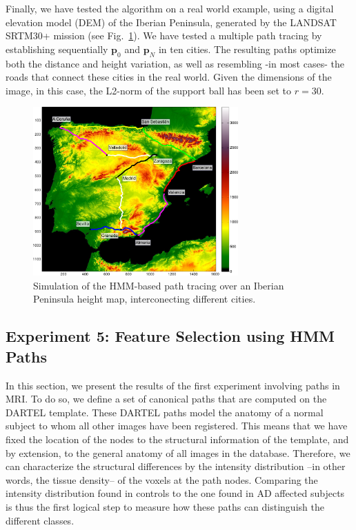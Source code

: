Finally, we have tested the algorithm on a real world example, using a digital elevation model (DEM) of the Iberian Peninsula, generated by the LANDSAT SRTM30+ mission (see Fig.~\ref{fig:spainmap}). We have tested a multiple path tracing by establishing sequentially $\mathbf{p}_0$ and $\mathbf{p}_N$ in ten cities. The resulting paths optimize both the distance and height variation, as well as resembling -in most cases- the roads that connect these cities in the real world. Given the dimensions of the image, in this case, the L2-norm of the support ball has been set to $r=30$. 

\begin{figure}[htp]
	\centering
	\includegraphics[width=0.7\textwidth]{Graphics/ch6/spain.pdf}
	\caption{Simulation of the \ac{HMM}-based path tracing over an Iberian Peninsula height map, interconecting different cities.}
	\label{fig:spainmap}
\end{figure}


\subsection{Experiment 5: Feature Selection using HMM Paths}

In this section, we present the results of the first experiment involving paths in MRI. To do so, we define a set of canonical paths that are computed on the DARTEL template. These DARTEL paths model the anatomy of a normal subject to whom all other images have been registered. This means that we have fixed the location of the nodes to the structural information of the template, and by extension, to the general anatomy of all images in the database. Therefore, we can characterize the structural differences by the intensity distribution --in other words, the tissue density--  of the voxels at the path nodes. Comparing the intensity distribution found in controls to the one found in AD affected subjects is thus the first logical step to measure how these paths can distinguish the different classes.

